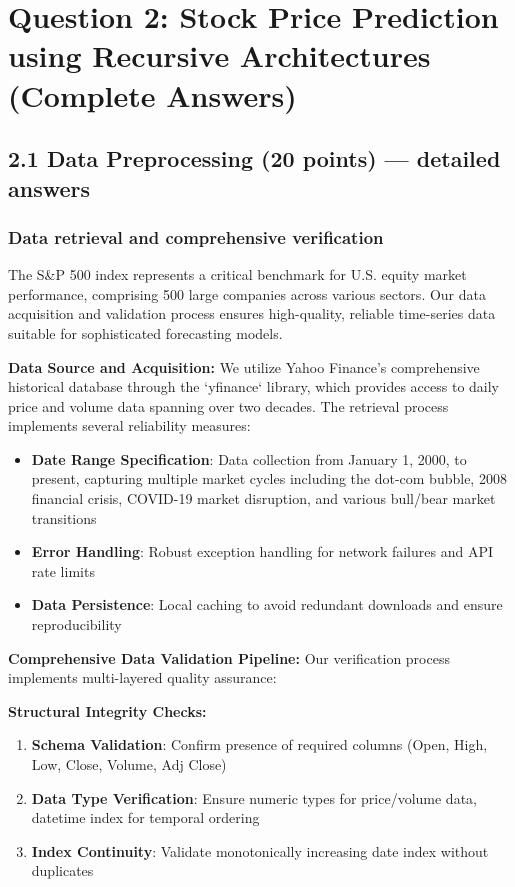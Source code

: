 \documentclass[conference]{IEEEtran}
\begin{document}
\section{Question 2: Stock Price Prediction using Recursive Architectures (Complete Answers)}
\subsection{2.1 Data Preprocessing (20 points) — detailed answers}
\subsubsection{Data retrieval and comprehensive verification}

The S\&P 500 index represents a critical benchmark for U.S. equity market performance, comprising 500 large companies across various sectors. Our data acquisition and validation process ensures high-quality, reliable time-series data suitable for sophisticated forecasting models.

\textbf{Data Source and Acquisition:}
We utilize Yahoo Finance's comprehensive historical database through the `yfinance` library, which provides access to daily price and volume data spanning over two decades. The retrieval process implements several reliability measures:
\begin{itemize}
  \item \textbf{Date Range Specification}: Data collection from January 1, 2000, to present, capturing multiple market cycles including the dot-com bubble, 2008 financial crisis, COVID-19 market disruption, and various bull/bear market transitions
  \item \textbf{Error Handling}: Robust exception handling for network failures and API rate limits
  \item \textbf{Data Persistence}: Local caching to avoid redundant downloads and ensure reproducibility
\end{itemize}

\textbf{Comprehensive Data Validation Pipeline:}
Our verification process implements multi-layered quality assurance:

\textbf{Structural Integrity Checks:}
\begin{enumerate}
  \item \textbf{Schema Validation}: Confirm presence of required columns (Open, High, Low, Close, Volume, Adj Close)
  \item \textbf{Data Type Verification}: Ensure numeric types for price/volume data, datetime index for temporal ordering
  \item \textbf{Index Continuity}: Validate monotonically increasing date index without duplicates
\end{enumerate}
\end{document}
